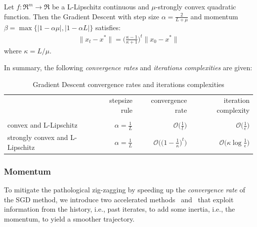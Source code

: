 \begin{theorem}[\href{https://angms.science/doc/CVX/CVX_HBM.pdf\#page=5}{Gradient Descent convergence for convex quadratic functions}] \label{thm:quad_gd_convergence}
Let $f: \Re^m \rightarrow \Re$ be a L-Lipschitz continuous and $\mu$-strongly convex quadratic function. Then the Gradient Descent with step size $\alpha = \displaystyle \frac{2}{L + \mu}$ and momentum $\beta = \max{\{|1 - \alpha \mu|, |1 - \alpha L|\}}$ satisfies:
$$
\begin{aligned}
	\| x_t - x^* \| = \bigg(\frac{\kappa-1}{\kappa+1}\bigg)^t \| x_0 - x^* \|
\end{aligned}
$$
where $\kappa = L/\mu$.
\end{theorem}

In summary, the following \emph{convergence rates} and \emph{iterations complexities} are given:

\begin{table}[H]
\centering
\caption{Gradient Descent convergence rates and iterations complexities}
\label{gradient_rates}
\begin{tabular}{lrrr}
\toprule
	& stepsize rule & convergence rate & iteration complexity \\
 	& 		& 		& 		\\
\midrule
convex and L-Lipschitz & $\displaystyle \alpha = \frac{1}{L}$ & $\displaystyle \mathcal{O}\Bigg(\frac{1}{t}\Bigg)$ & $\displaystyle \mathcal{O}\Bigg(\frac{1}{\epsilon}\Bigg)$ \\
strongly convex and L-Lipschitz & $\displaystyle \alpha = \frac{1}{L}$ & $\displaystyle \mathcal{O}\Bigg(\Bigg(1 - \frac{1}{\kappa}\Bigg)^t\Bigg)$ & $\displaystyle \mathcal{O}\Bigg(\kappa \log \frac{1}{\epsilon}\Bigg)$ \\
\bottomrule
\end{tabular}
\end{table}


\subsubsection{Momentum}

To mitigate the pathological zig-zagging by speeding up the \emph{convergence rate} of the SGD method, we introduce two accelerated methods~\cite{polyak1964some} and~\cite{nesterov1998introductory, nesterov1983method} that exploit information from the history, i.e., past iterates, to add some inertia, i.e., the momentum, to yield a smoother trajectory.

